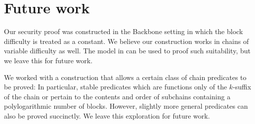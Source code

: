 \section{Future work}

Our security proof was constructed in the Backbone \cite{backbone} setting in
which the block difficulty is treated as a constant. We believe our
construction works in chains of variable difficulty as well. The model in
\cite{backbone2} can be used to proof such suitability, but we leave this for
future work.

We worked with a construction that allows a certain class of chain predicates
to be proved: In particular, stable predicates which are functions only of the
$k$-suffix of the chain or pertain to the contents and order of subchains
containing a polylogarithmic number of blocks. However, slightly more general
predicates can also be proved succinctly. We leave this exploration for future
work.
